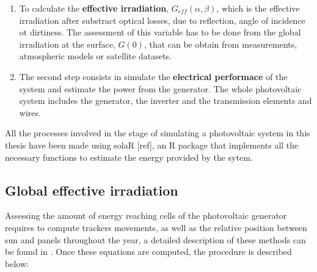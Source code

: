 \begin{enumerate}
\item To calculate the \textbf{effective irradiation}, $G_{eff}(\alpha, \beta)$, which is the effective irradiation after substract optical losses, due to reflection, angle of incidence ot dirtiness. The assessment of this variable has to be done from the global irradiation at the surface, $G(0)$, that can be obtain from measurements, atmospheric models or satellite datasets.
\item The second step consists in simulate the \textbf{electrical performace} of the system and estimate the power from the generator. The whole photovoltaic system includes the generator, the inverter and the transmission elements and wires.
\end{enumerate}

All the processes involved in the stage of simulating a photovoltaic system in this thesis have been made using solaR [ref], an R package that implements all the necessary functions to estimate the energy provided by the sytem.

\subsection{Global effective irradiation}

Assessing the amount of energy reaching cells of the photovoltaic generator requires to compute trackers movements, as well as the relative position between sun and panels throughout the year, a detailed description of these methods can be found in \citep{Perpinan.Marcos.ea2013}.  Once these equations are computed, the procedure is described below:

